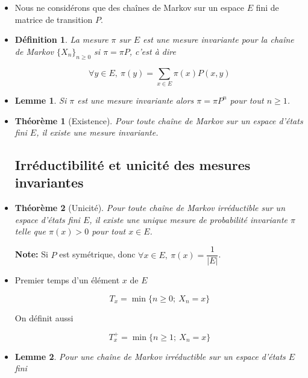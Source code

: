 \documentclass[10pt,a4paper,oneside]{article}
\newtheorem{theoreme}{Théorème}
\newtheorem{lemme}{Lemme}
\newtheorem{definition}{Définition}
\begin{document}
\begin{itemize}

\item
Nous ne considérons que des chaînes de Markov sur un espace $E$ fini de matrice de transition $P$.

\item
\begin{definition}
La mesure $\pi$ sur $E$ est une mesure invariante pour la chaîne de Markov $\{ X_n \}_{n \geq 0}$ si $\pi = \pi P$, c'est à dire

\[ \forall y \in E,\ \pi(y) = \sum_{x \in E} \pi(x) P(x,y) \]
\end{definition}

\item
\begin{lemme}
Si $\pi$ est une mesure invariante alors $\pi = \pi P^n$ pour tout $n \geq 1$.
\end{lemme}

\item
\begin{theoreme}[Existence]
Pour toute chaîne de Markov sur un espace d'états fini $E$, il existe une mesure invariante.
\end{theoreme}

\subsection{Irréductibilité et unicité des mesures invariantes}

\item
\begin{theoreme}[Unicité]
Pour toute chaîne de Markov irréductible sur un espace d'états fini $E$, il existe une unique mesure de probabilité invariante $\pi$ telle que $\pi(x) > 0$ pour tout $x \in E$.
\end{theoreme}

\textbf{Note:} Si $P$ est symétrique, donc $\forall x \in E,\ \pi(x) = \dfrac{1}{|E|}$.

\item
Premier temps d'un élément $x$ de $E$

\[ T_x = \min \{ n \geq 0;\ X_n = x \} \]

On définit aussi

\[ T_x^+ = \min \{ n \geq 1;\ X_n = x \} \]

\item
\begin{lemme}
Pour une chaîne de Markov irréductible sur un espace d'états $E$ fini


\end{lemme}
\end{itemize}
\end{document}
